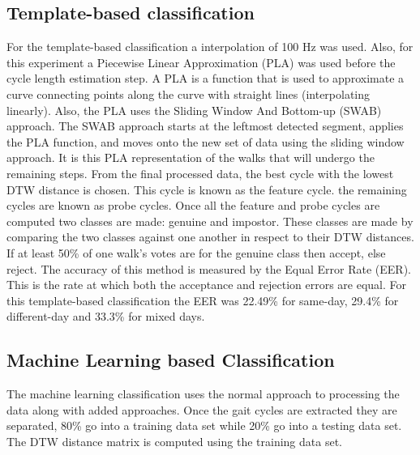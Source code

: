 \documentclass{sig-alternate}
\begin{document}
\subsection{Template-based classification}
	 For the template-based classification a interpolation of 100 Hz was used. Also, for this experiment a Piecewise Linear Approximation (PLA) was used before the cycle length estimation step. A PLA is a function that is used to approximate a curve connecting points along the curve with straight lines (interpolating linearly). Also, the PLA uses the Sliding Window And Bottom-up (SWAB) approach. The SWAB approach starts at the leftmost detected segment, applies the PLA function, and moves onto the new set of data using the sliding window approach. It is this PLA representation of the walks that will undergo the remaining steps. From the final processed data, the best cycle with the lowest DTW distance is chosen. This cycle is known as the feature cycle. the remaining cycles are known as probe cycles. Once all the feature and probe cycles are computed two classes are made: genuine and impostor. These classes are made by comparing the two classes against one another in respect to their DTW distances. If at least 50\% of one walk's votes are for the genuine class then accept, else reject. The accuracy of this method is measured by the Equal Error Rate (EER). This is the rate at which both the acceptance and rejection errors are equal. For this template-based classification the EER was 22.49\% for same-day, 29.4\% for different-day and 33.3\% for mixed days.


\subsection{Machine Learning based Classification}
	The machine learning classification uses the normal approach to processing the data along with added approaches. Once the gait cycles are extracted they are separated, 80\% go into a training data set while 20\% go into a testing data set. The DTW distance matrix is computed using the training data set.
\end{document}
